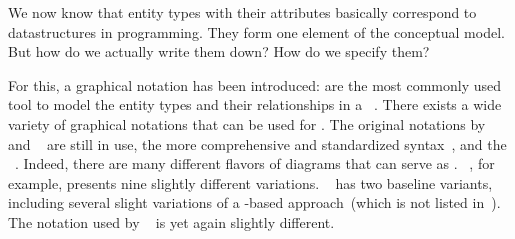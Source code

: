 %
We now know that entity types with their attributes basically correspond to datastructures in programming.
They form one element of the conceptual model.
But how do we actually write them down?
How do we specify them?

For this, a graphical notation has been introduced:
 are the most commonly used tool to model the entity types and their relationships in a \db~\cite{C2002ERMHEFTALL,C1975TRMTAUVOD,C1976TERMTAUVOD,KW2012ASHOTEDAIM,WF1995DHQDM,B1990CMERMO}.
There exists a wide variety of graphical notations that can be used for .
The original notations by \citeauthor{B1969DSD}~\cite{B1969DSD} and \citeauthor{C1975TRMTAUVOD}~\cite{C1975TRMTAUVOD,C1976TERMTAUVOD} are still in use, the more comprehensive and standardized  syntax~\cite{FIPSPUB184,ISOIECIEEE2012ITMLP2SASFII}, and the ~\cite{OMG2017OUMLOU,RMHOSMUUIIIIOPPTRS1997UNG,BRJ1999TUMLRM}.
Indeed, there are many different flavors of diagrams that can serve as .
~\cite{S2024D:CDMERDE}, for example, presents nine slightly different variations.
~\cite{SS2005EIDDDFDB:CDDRAAML} has two baseline variants, including several slight variations of a -based approach~(which is not listed in~\cite{S2024D:CDMERDE}).
The notation used by \citeauthor{V1999C5DMS:CDUTERM}~\cite{V1999C5DMS:CDUTERM} is yet again slightly different.


